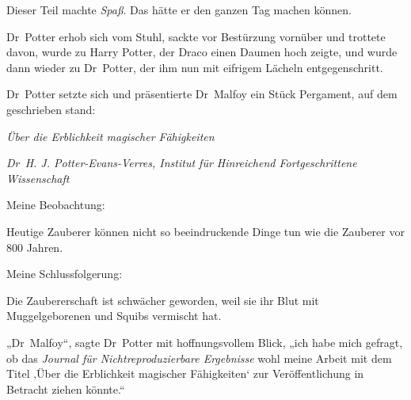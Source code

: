 Dieser Teil machte \emph{Spaß}. Das hätte er den ganzen Tag machen können.

Dr~Potter erhob sich vom Stuhl, sackte vor Bestürzung vornüber und trottete davon, wurde zu Harry Potter, der Draco einen Daumen hoch zeigte, und wurde dann wieder zu Dr~Potter, der ihm nun mit eifrigem Lächeln entgegenschritt.

Dr~Potter setzte sich und präsentierte Dr~Malfoy ein Stück Pergament, auf dem geschrieben stand:

\begin{center}
\emph{Über die Erblichkeit magischer Fähigkeiten}

\emph{Dr~H. J. Potter-Evans-Verres, Institut für Hinreichend Fortgeschrittene Wissenschaft}
\end{center}

\begin{writtenNote}
Meine Beobachtung:

Heutige Zauberer können nicht so beeindruckende Dinge tun wie die Zauberer vor 800 Jahren.

Meine Schlussfolgerung:

Die Zaubererschaft ist schwächer geworden, weil sie ihr Blut mit Muggelgeborenen und Squibs vermischt hat.
\end{writtenNote}

„Dr~Malfoy“, sagte Dr~Potter mit hoffnungsvollem Blick, „ich habe mich gefragt, ob das \emph{Journal für Nichtreproduzierbare Ergebnisse} wohl meine Arbeit mit dem Titel ‚Über die Erblichkeit magischer Fähigkeiten‘ zur Veröffentlichung in Betracht ziehen könnte.“

